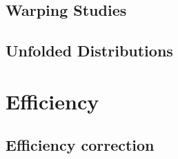 \subsection{Warping Studies}

\subsection{Unfolded Distributions}


\section{Efficiency}

\subsection{Efficiency correction}
